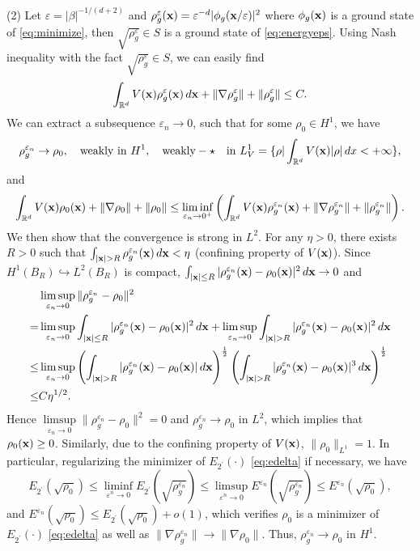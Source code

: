 \documentclass{elsarticle}
\newcommand{\vep}{\varepsilon}
\newcommand{\be}{\begin{equation}}
\newcommand{\ee}{\end{equation}}
\newcommand{\bx}{{\bf x} }
\begin{document}
(2) Let $\vep=|\beta|^{-1/(d+2)}$ and $\rho_g^\vep(\bx)=\vep^{-d}|\phi_g(\bx/\vep)|^2$ where $\phi_g(\bx)$ is a ground state of \eqref{eq:minimize}, then
$\sqrt{\rho_g^{\vep}}\in S$ is a ground state of \eqref{eq:energyeps}. Using Nash inequality with the fact $\sqrt{\rho_g^{\vep}}\in S$, we can easily find
\be
\int_{\Bbb R^d}V(\bx)\rho_g^\vep(\bx)\,d\bx+\|\nabla\rho_g^\vep\|+\|\rho_g^\vep\|\leq C.
\ee
We can extract a subsequence $\vep_n\to0$, such that for some $\rho_0\in H^1$,
we have
\be
\rho_g^{\vep_n}\to \rho_0,\quad \text{weakly in } H^1,\quad \text{weakly}-\star\quad \text{in } L_V^1=\{\rho|\int_{\Bbb R^d}V(\bx)|\rho|\,dx<+\infty\},
\ee
and
\begin{equation*}
\int_{\Bbb R^d}V(\bx)\rho_0(\bx)+\|\nabla\rho_0\|+\|\rho_0\|\leq\liminf\limits_{\vep_n\to0^+}\left(\int_{\Bbb R^d}V(\bx)\rho_g^{\vep_n}(\bx)+\|\nabla\rho_g^{\vep_n}\|+\|\rho_g^{\vep_n}\|\right).
\end{equation*}
We then show that the convergence is strong in $L^2$. For any $\eta>0$, there exists $R>0$ such that $\int_{|\bx|>R}\rho_g^{\vep_n}(\bx)\,d\bx<\eta$ (confining property of $V(\bx)$).
Since $H^1(B_R)\hookrightarrow L^2(B_R)$ is compact, $\int_{|\bx|\leq R}|\rho_g^{\vep_n}(\bx)-\rho_0(\bx)|^2\,d\bx\to0$ and
\begin{align*}
&\limsup\limits_{\vep_n\to0}\|\rho_g^{\vep_n}-\rho_0\|^2\\
=&
\limsup\limits_{\vep_n\to0}\int_{|\bx|\leq R}|\rho_g^{\vep_n}(\bx)-\rho_0(\bx)|^2\,d\bx+\limsup\limits_{\vep_n\to0}\int_{|\bx|> R}|\rho_g^{\vep_n}(\bx)-\rho_0(\bx)|^2\,d\bx\\
\leq&\limsup\limits_{\vep_n\to0}\left(\int_{|\bx|> R}|\rho_g^{\vep_n}(\bx)-\rho_0(\bx)|\,d\bx\right)^{\frac12}
\left(\int_{|\bx|> R}|\rho_g^{\vep_n}(\bx)-\rho_0(\bx)|^3\,d\bx\right)^{\frac12}\\
\leq& C\eta^{1/2}.
\end{align*}
Hence $\limsup\limits_{\vep_n\to0}\|\rho_g^{\vep_n}-\rho_0\|^2=0$ and $\rho_g^{\vep_n}\to\rho_0$ in $L^2$, which implies that $\rho_0(\bx)\ge0$. Similarly, due to the confining property of
$V(\bx)$, $\|\rho_0\|_{L^1}=1$. In particular, regularizing the minimizer of $E_{2^\prime}(\cdot)$ \eqref{eq:edelta} if necessary, we have
\begin{equation*}
E_{2^\prime}(\sqrt{\rho_0})\leq \liminf\limits_{\vep^n\to0} E_{2^\prime}(\sqrt{\rho_g^{\vep_n}})\leq \limsup\limits_{\vep^n\to0} E^{\vep_n}(\sqrt{\rho_g^{\vep_n}})\leq
E^{\vep_n}(\sqrt{\rho_0}),
\end{equation*}
and $E^{\vep_n}(\sqrt{\rho_0})\leq E_{2^\prime}(\sqrt{\rho_0})+o(1)$, which verifies $\rho_0$ is a minimizer of $E_{2^\prime}(\cdot)$ \eqref{eq:edelta} as well as $\|\nabla\rho_g^{\vep_n}\|\to\|\nabla\rho_0\|$. Thus, $\rho_g^{\vep_n}\to\rho_0$ in $H^1$.
\end{document}
